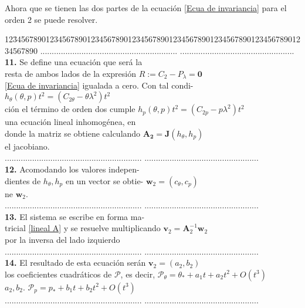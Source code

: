 Ahora que se tienen las dos partes de la ecuación \eqref{Ecua de invariancia} para el orden 2 se puede resolver.
\begin{tabbing}
12\=34567890123456789012345678901234567890123456\=7890123456789012345678901234567890\kill%
\>............................................................  \>..................................................\\
\>\textbf{11.} Se define una ecuación que será la  \> \\
\>resta de ambos lados de la expresión \> $R :=C_{2}-P_{\lambda}=\mathbf{0} $\\
\>\eqref{Ecua de invariancia} igualada a cero. Con tal condi-\> $h_{\theta}(\theta,p)t^{2}=(C_{2\theta}-\theta\lambda^{2})t^{2} $\\
\>ción el término de orden dos cumple\> $h_{p}(\theta,p)t^{2}=(C_{2p}-p\lambda^{2})t^{2}$\\
\>una ecuación lineal inhomogénea, en \> \\
\>donde la matriz se obtiene calculando \> $\mathbf{A_{2}}=\mathbf{J}(h_{\theta},h_{p})$\\ 
\>el jacobiano.\>\\
\>............................................................  \>..................................................\\
\>\textbf{12.} Acomodando los valores indepen-\> \\
\>dientes de $h_{\theta},h_{p}$ en un vector se obtie- \>$\mathbf{w}_{2}=(c_{\theta},c_{p})$ \\
\>ne $\mathbf{w}_{2}$. \> \\
\>............................................................  \>..................................................\\
\>\textbf{13.} El sistema se escribe en forma ma- \> \\
\>tricial \eqref{lineal A} y se resuelve multiplicando \> $\mathbf{v}_{2}=\mathbf{A}_{2}^{-1}\mathbf{w}_{2}$\\ 
\>por la inversa del lado izquierdo  \>\\
\>............................................................  \>..................................................\\
\>\textbf{14.} El resultado de esta ecuación serán \> $\mathbf{v}_{2}=(a_{2},b_{2})$ \\
\>los coeficientes cuadráticos de $\mathcal{P}$, es decir, \>$\mathcal{P}_{\theta}=\theta_{*}+a_{1}t+a_{2}t^{2}+O(t^{3})$ \\
\>$a_{2},b_{2}$.\> $\mathcal{P}_{p}=p_{*}+b_{1}t+b_{2}t^{2}+O(t^{3})$ \\
\>............................................................  \>..................................................\\
\end{tabbing}

